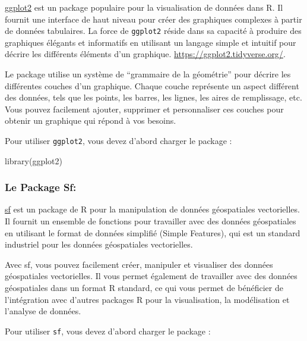 \documentclass[
]{article}
\newenvironment{Shaded}{\begin{snugshade}}{\end{snugshade}}
\newcommand{\FunctionTok}[1]{\textcolor[rgb]{0.00,0.00,0.00}{#1}}
\newcommand{\NormalTok}[1]{#1}
\begin{document}
\href{\textquotesingle{}https://ggplot2.tidyverse.org/\textquotesingle{}}{ggplot2}
est un package populaire pour la visualisation de données dans R. Il
fournit une interface de haut niveau pour créer des graphiques complexes
à partir de données tabulaires. La force de \texttt{ggplot2} réside dans
sa capacité à produire des graphiques élégants et informatifs en
utilisant un langage simple et intuitif pour décrire les différents
éléments d'un graphique. \url{https://ggplot2.tidyverse.org/}.

Le package utilise un système de ``grammaire de la géométrie'' pour
décrire les différentes couches d'un graphique. Chaque couche représente
un aspect différent des données, tels que les points, les barres, les
lignes, les aires de remplissage, etc. Vous pouvez facilement ajouter,
supprimer et personnaliser ces couches pour obtenir un graphique qui
répond à vos besoins.

Pour utiliser \texttt{ggplot2}, vous devez d'abord charger le package :

\begin{Shaded}
\begin{Highlighting}[]
\FunctionTok{library}\NormalTok{(ggplot2)}
\end{Highlighting}
\end{Shaded}

\hypertarget{le-package-sf}{%
\subsubsection{\texorpdfstring{Le Package
\textbf{Sf}:}{Le Package Sf:}}\label{le-package-sf}}

\href{\textquotesingle{}https://cran.r-project.org/web/packages/sf/index.html\textquotesingle{}}{sf}
est un package de R pour la manipulation de données géospatiales
vectorielles. Il fournit un ensemble de fonctions pour travailler avec
des données géospatiales en utilisant le format de données simplifié
(Simple Features), qui est un standard industriel pour les données
géospatiales vectorielles.

Avec sf, vous pouvez facilement créer, manipuler et visualiser des
données géospatiales vectorielles. Il vous permet également de
travailler avec des données géospatiales dans un format R standard, ce
qui vous permet de bénéficier de l'intégration avec d'autres packages R
pour la visualisation, la modélisation et l'analyse de données.

Pour utiliser \texttt{sf}, vous devez d'abord charger le package :
\end{document}
